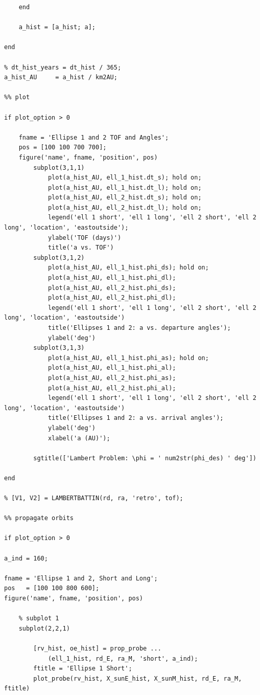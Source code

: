 \documentclass[conf]{new-aiaa}
\begin{document}
\begin{lstlisting}
    end 
    
    a_hist = [a_hist; a]; 
    
end 

% dt_hist_years = dt_hist / 365; 
a_hist_AU     = a_hist / km2AU; 

%% plot 

if plot_option > 0 
    
    fname = 'Ellipse 1 and 2 TOF and Angles'; 
    pos = [100 100 700 700]; 
    figure('name', fname, 'position', pos)
        subplot(3,1,1)
            plot(a_hist_AU, ell_1_hist.dt_s); hold on; 
            plot(a_hist_AU, ell_1_hist.dt_l); hold on; 
            plot(a_hist_AU, ell_2_hist.dt_s); hold on; 
            plot(a_hist_AU, ell_2_hist.dt_l); hold on; 
            legend('ell 1 short', 'ell 1 long', 'ell 2 short', 'ell 2 long', 'location', 'eastoutside'); 
            ylabel('TOF (days)') 
            title('a vs. TOF') 
        subplot(3,1,2) 
            plot(a_hist_AU, ell_1_hist.phi_ds); hold on; 
            plot(a_hist_AU, ell_1_hist.phi_dl); 
            plot(a_hist_AU, ell_2_hist.phi_ds); 
            plot(a_hist_AU, ell_2_hist.phi_dl); 
            legend('ell 1 short', 'ell 1 long', 'ell 2 short', 'ell 2 long', 'location', 'eastoutside')
            title('Ellipses 1 and 2: a vs. departure angles'); 
            ylabel('deg') 
        subplot(3,1,3) 
            plot(a_hist_AU, ell_1_hist.phi_as); hold on; 
            plot(a_hist_AU, ell_1_hist.phi_al); 
            plot(a_hist_AU, ell_2_hist.phi_as); 
            plot(a_hist_AU, ell_2_hist.phi_al); 
            legend('ell 1 short', 'ell 1 long', 'ell 2 short', 'ell 2 long', 'location', 'eastoutside')
            title('Ellipses 1 and 2: a vs. arrival angles'); 
            ylabel('deg') 
            xlabel('a (AU)'); 

        sgtitle(['Lambert Problem: \phi = ' num2str(phi_des) ' deg'])
    
end 

% [V1, V2] = LAMBERTBATTIN(rd, ra, 'retro', tof); 

%% propagate orbits 

if plot_option > 0 

a_ind = 160; 

fname = 'Ellipse 1 and 2, Short and Long'; 
pos   = [100 100 800 600]; 
figure('name', fname, 'position', pos)

    % subplot 1 
    subplot(2,2,1) 

        [rv_hist, oe_hist] = prop_probe ... 
            (ell_1_hist, rd_E, ra_M, 'short', a_ind);         
        ftitle = 'Ellipse 1 Short'; 
        plot_probe(rv_hist, X_sunE_hist, X_sunM_hist, rd_E, ra_M, ftitle) 
        

\end{lstlisting}
\end{document}
